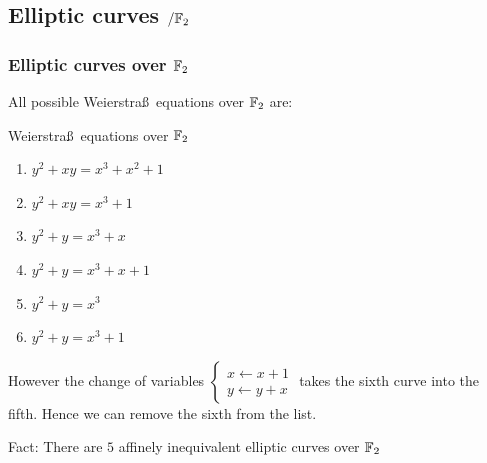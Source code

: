 \documentclass[10pt,handout]{beamer} %
\begin{document}
\subsection{Elliptic curves \texorpdfstring{$/\mathbb F_2$}{F2}}
\begin{frame}
\frametitle{Elliptic curves over $\mathbb F_2$}

All possible Weierstra\ss\ equations over $\mathbb F_2$ are:\pause

\begin{beamerboxesrounded}[upper=block title example,lower=block body alerted,shadow=true]{Weierstra\ss\ equations over $\mathbb F_2$}
\begin{enumerate}
 \item $y^2+xy=x^3+x^2+1$
 \item$y^2+xy=x^3+1$
 \item$y^2+y=x^3+x$
 \item$y^2+y=x^3+x+1$
 \item$y^2+y=x^3$
 \item$y^2+y=x^3+1$
 \end{enumerate}
\end{beamerboxesrounded}
\pause

However the change of variables
$\begin{cases} x\leftarrow x+1\\ y\leftarrow y+x\end{cases}$ takes the sixth curve
into the fifth. Hence we can remove the sixth from the list.
\pause\bigskip

\begin{beamerboxesrounded}[upper=postit,lower=block body,shadow=true]{Fact:}
There are $5$ affinely inequivalent elliptic curves over $\mathbb F_2$
\end{beamerboxesrounded}
\end{frame}
\end{document}
